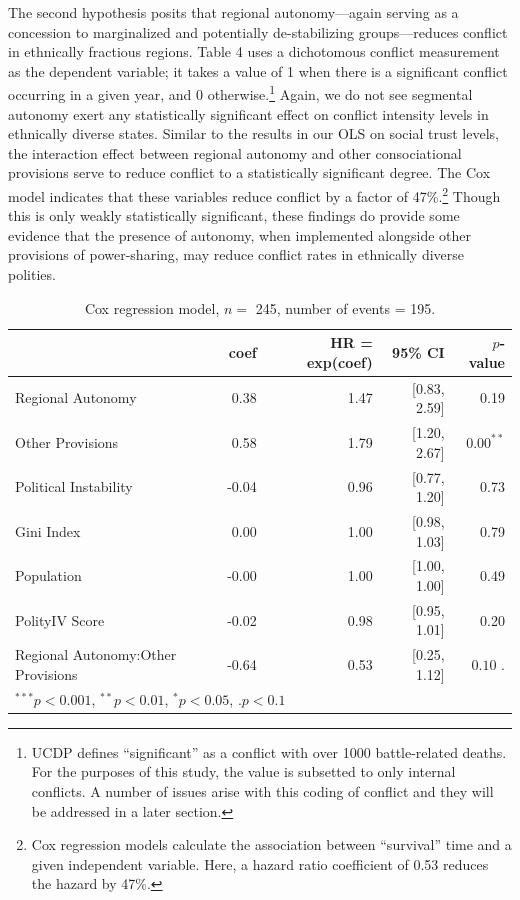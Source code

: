 \documentclass[12pt]{article}
\begin{document}
The second hypothesis posits that regional autonomy---again serving as a concession to marginalized and potentially de-stabilizing groups---reduces conflict in ethnically fractious regions. Table 4 uses a dichotomous conflict measurement as the dependent variable; it takes a value of 1 when there is a significant conflict occurring in a given year, and 0 otherwise.\footnote{UCDP defines ``significant'' as a conflict with over 1000 battle-related deaths. For the purposes of this study, the value is subsetted to only internal conflicts. A number of issues arise with this coding of conflict and they will be addressed in a later section.} Again, we do not see segmental autonomy exert any statistically significant effect on conflict intensity levels in ethnically diverse states. Similar to the results in our OLS on social trust levels, the interaction effect between regional autonomy and other consociational provisions serve to reduce conflict to a statistically significant degree. The Cox model indicates that these variables reduce conflict by a factor of 47\%.\footnote{Cox regression models calculate the association between ``survival'' time and a given independent variable. Here, a hazard ratio coefficient of 0.53 reduces the hazard by 47\%.} Though this is only weakly statistically significant, these findings do provide some evidence that the presence of autonomy, when implemented alongside other provisions of power-sharing, may reduce conflict rates in ethnically diverse polities. 

\begin{table}[!htbp]
	\centering
	\begin{tabular}{lrrrr}
		\hline
		& coef & HR = exp(coef) & 95\% CI & $p$-value \\ 
		\hline
		Regional Autonomy & 0.38 & 1.47 & [0.83, 2.59] & 0.19 \\ 
		Other Provisions & 0.58 & 1.79 & [1.20, 2.67] & $0.00^{**}$ \\ 
		Political Instability & -0.04 & 0.96 & [0.77, 1.20] & 0.73 \\ 
		Gini Index & 0.00 & 1.00 & [0.98, 1.03] & 0.79 \\ 
		Population & -0.00 & 1.00 & [1.00, 1.00] & 0.49 \\ 
		PolityIV Score & -0.02 & 0.98 & [0.95, 1.01] & 0.20 \\ 
		Regional Autonomy:Other Provisions & -0.64 & 0.53 & [0.25, 1.12] & $0.10 {\textbf{ .}}$ \\ 
		\hline
		\multicolumn{4}{l}{\scriptsize{$^{***}p<0.001$, $^{**}p<0.01$, $^*p<0.05$, $\textbf{.}p<0.1$}}
	\end{tabular}
	\caption{Cox regression model, $n = $ 245, number of events = 195.} 
	\label{mod}
\end{table}
\end{document}
